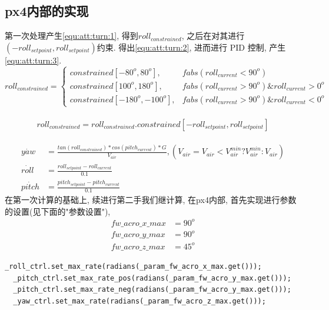 \subsection{px4内部的实现}
第一次处理产生\ref{equ:att:turn:1}, 得到$roll_{constrained}$, 之后在对其进行$(-roll_{setpoint}, roll_{setpoint})$约束. 得出\ref{equ:att:turn:2}, 进而进行 PID 控制, 产生\ref{equ:att:turn:3}.
\begin{equation}
  roll_{constrained}=
  \begin{cases}
  constrained[-80^{o}, 80^{o}], &fabs(roll_{current} < 90^{o}) \\
  constrained[100^{o}, 180^{o}], &fabs(roll_{current} > 90^{o}) \& roll_{current} > 0^{o}\\
  constrained[-180^{o}, -100^{o}], &fabs(roll_{current} > 90^{o}) \&roll_{current} < 0^{o}
  \end{cases}
  \label{equ:att:turn:1}
\end{equation} \\
\begin{equation}
  roll_{constrained} =roll_{constrained}.constrained[-roll_{setpoint}, roll_{setpoint}]
  \label{equ:att:turn:2}
\end{equation}\\
\begin{equation}
  \begin{split}
    \dot{yaw} &= \frac{tan(roll_{constrained}) * cos(pitch_{current}) * G}{V_{air}} , (V_{air} = V_{air} < V_{air}^{min} ? V_{air}^{min} : V_{air}) \\
    \dot{roll} &= \frac{roll_{setpoint} - roll_{current}}{0.1} \\
    \dot{pitch} &= \frac{pitch_{setpoint} - pitch_{current}}{0.1}
    \label{equ:att:turn:3}
  \end{split}
\end{equation}
在第一次计算的基础上, 续进行第二手我们继计算, 在px4内部, 首先实现进行参数的设置(见下面的"参数设置"), 
\begin{equation}
  \begin{split}
  fw\_acro\_x\_max &= 90^{o} \\
  fw\_acro\_y\_max &= 90^{o} \\
  fw\_acro\_z\_max &= 45^{o}
  \end{split}
  \label{equ:config}
\end{equation}
\begin{lstlisting}[title=参数设置, frame=shadowbox]
  _roll_ctrl.set_max_rate(radians(_param_fw_acro_x_max.get()));
  _pitch_ctrl.set_max_rate_pos(radians(_param_fw_acro_y_max.get()));
  _pitch_ctrl.set_max_rate_neg(radians(_param_fw_acro_y_max.get()));
  _yaw_ctrl.set_max_rate(radians(_param_fw_acro_z_max.get()));
\end{lstlisting}
